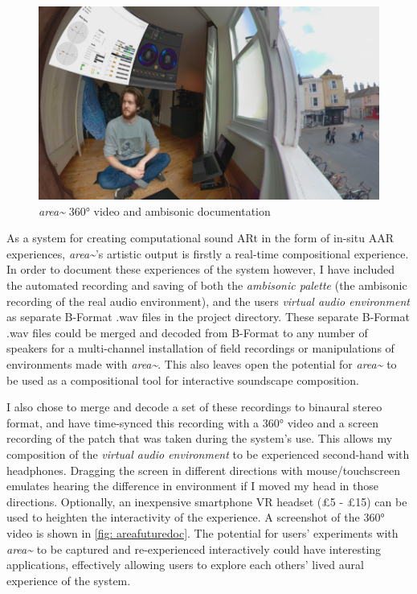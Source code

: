 \begin{figure}
    \centering
    \includegraphics{figures/05-area/areafuturedoc.png}
    \caption{\textit{area\textasciitilde{}} 360° video and ambisonic documentation }
    \label{fig: areafuturedoc}
\end{figure}
As a system for creating computational sound ARt in the form of in-situ AAR experiences, \textit{area\textasciitilde{}}’s artistic output is firstly a real-time compositional experience. In order to document these experiences of the system however, I have included the automated recording and saving of both the \textit{ambisonic palette} (the ambisonic recording of the real audio environment), and the users \textit{virtual audio environment} as separate B-Format .wav files in the project directory. These separate B-Format .wav files could be merged and decoded from B-Format to any number of speakers for a multi-channel installation of field recordings or manipulations of environments made with \textit{area\textasciitilde{}}. This also leaves open the potential for \textit{area\textasciitilde{}} to be used as a compositional tool for interactive soundscape composition.

I also chose to merge and decode a set of these recordings to binaural stereo format, and have time-synced this recording with a 360° video and a screen recording of the patch that was taken during the system’s use. This allows my composition of the \textit{virtual audio environment} to be experienced second-hand with headphones. Dragging the screen in different directions with mouse/touchscreen emulates hearing the difference in environment if I moved my head in those directions. Optionally, an inexpensive smartphone VR headset (£5 - £15) can be used to heighten the interactivity of the experience. A screenshot of the 360° video \citep{bilbow2020} is shown in \autoref{fig: areafuturedoc}. The potential for users’ experiments with \textit{area\textasciitilde{}} to be captured and re-experienced interactively could have interesting applications, effectively allowing users to explore each others’ lived aural experience of the system.




